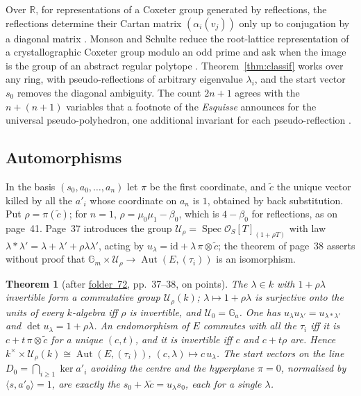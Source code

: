 \documentclass[11pt,a4paper]{amsart}
\newtheorem{theorem}{Theorem}[section]
\theoremstyle{definition}
\theoremstyle{remark}
\newcommand{\R}{\mathbb R}
\newcommand{\id}{\mathrm{id}}
\newcommand{\fac}[1]{\href{https://grothendieck.umontpellier.fr/#1.pdf}{folder~#1}}
\begin{document}
Over $\R$, for representations of a Coxeter group generated by reflections, the reflections determine their Cartan matrix $(\alpha_i(v_j))$ only up to conjugation by a diagonal matrix \cite[\S3.2]{dgklm2021}. Monson and Schulte reduce the root-lattice representation of a crystallographic Coxeter group modulo an odd prime and ask when the image is the group of an abstract regular polytope \cite{monsonschulte2004}. Theorem~\ref{thm:classif} works over any ring, with pseudo-reflections of arbitrary eigenvalue $\lambda_i$, and the start vector $s_0$ removes the diagonal ambiguity. The count $2n+1$ agrees with the $n + (n+1)$ variables that a footnote of the \emph{Esquisse} announces for the universal pseudo-polyhedron, one additional invariant for each pseudo-reflection \cite[\S4]{esquisse}.

\subsection*{Automorphisms}
In the basis $(s_0, a_0, \dots, a_n)$ let $\pi$ be the first coordinate, and $\tilde c$ the unique vector killed by all the $a'_i$ whose coordinate on $a_n$ is $1$, obtained by back substitution. Put $\rho = \pi(\tilde c)$; for $n = 1$, $\rho = \mu_0\mu_1 - \beta_0$, which is $4 - \beta_0$ for reflections, as on page~41. Page~37 introduces the group $\mathcal U_\rho = \operatorname{Spec}\mathcal O_S[T]_{(1+\rho T)}$ with law $\lambda * \lambda' = \lambda + \lambda' + \rho\lambda\lambda'$, acting by $u_\lambda = \id + \lambda\,\pi\otimes\tilde c$; the theorem of page~38 asserts without proof that $\mathbb G_m \times \mathcal U_\rho \to \operatorname{Aut}(E, (\tau_i))$ is an isomorphism.

\begin{theorem}[after \fac{72}, pp.~37--38, on points]\label{thm:aut}
The $\lambda \in k$ with $1 + \rho\lambda$ invertible form a commutative group $\mathcal U_\rho(k)$; $\lambda \mapsto 1 + \rho\lambda$ is surjective onto the units of every $k$-algebra iff $\rho$ is invertible, and $\mathcal U_0 = \mathbb G_a$. One has $u_\lambda u_{\lambda'} = u_{\lambda*\lambda'}$ and $\det u_\lambda = 1 + \rho\lambda$. An endomorphism of $E$ commutes with all the $\tau_i$ iff it is $c + t\,\pi\otimes\tilde c$ for a unique $(c, t)$, and it is invertible iff $c$ and $c + t\rho$ are. Hence $k^\times \times \mathcal U_\rho(k) \cong \operatorname{Aut}(E, (\tau_i))$, $(c, \lambda) \mapsto c\,u_\lambda$. The start vectors on the line $D_0 = \bigcap_{i \ge 1}\ker a'_i$ avoiding the centre and the hyperplane $\pi = 0$, normalised by $\langle s, a'_0\rangle = 1$, are exactly the $s_0 + \lambda\tilde c = u_\lambda s_0$, each for a single $\lambda$.
\end{theorem}
\end{document}
